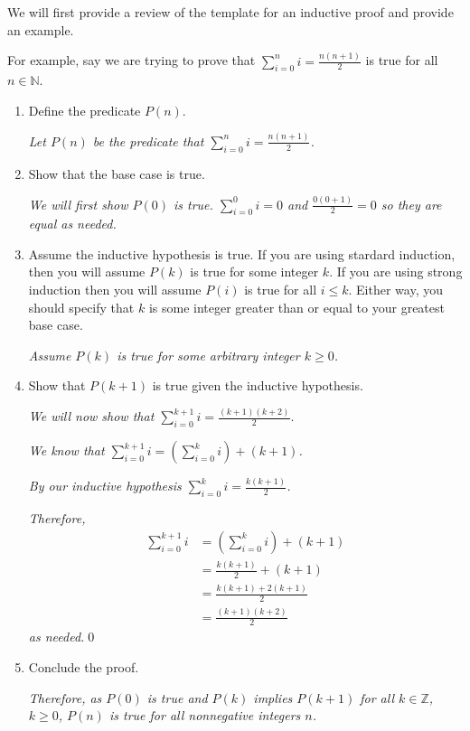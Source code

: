 \documentclass[12pt,letterpaper]{article}
\newcommand\Z{\mathbb Z}
\begin{document}
\begin{mdframed}
We will first provide a review of the template for an inductive proof and provide an example.

      For example, say we are trying to prove that $\sum_{i=0}^n i = \frac{n(n+1)}{2}$ is true for all $n \in \mathbb{N}$. 

      \begin{enumerate}
        \item Define the predicate $P(n)$.

        \textit{Let $P(n)$ be the predicate that $\sum_{i=0}^n i = \frac{n(n+1)}{2}$.}

        \item Show that the base case is true.

        \textit{We will first show $P(0)$ is true. $\sum_{i=0}^0 i = 0$ and $\frac{0(0+1)}{2} = 0$ so they are equal as needed.}

        \item Assume the inductive hypothesis is true. If you are using stardard induction, then you will assume 
            $P(k)$ is true for some integer $k$. If you are using strong induction then you will assume $P(i)$ is true for all $i \leq k$. Either way, you should specify that $k$ is some integer greater than or equal to your greatest base case.

        \textit{Assume $P(k)$ is true for some arbitrary integer $k \geq 0$.}

        \item Show that $P(k+1)$ is true given the inductive hypothesis.

        \textit{We will now show that  $\sum_{i=0}^{k+1} i = \frac{(k+1)(k+2)}{2}$}.

        \textit{We know that $\sum_{i=0}^{k+1} i = \left( \sum_{i=0}^{k} i \right)+ (k+1)$.}

        \textit{By our inductive hypothesis $\sum_{i=0}^k i = \frac{k(k+1)}{2}$.}

         \textit{Therefore,}
        \begin{align*}
            \sum_{i=0}^{k+1} i &= \left( \sum_{i=0}^{k} i \right)+ (k+1) \\
            &=  \frac{k(k+1)}{2} + (k+1) \\
            &= \frac{k(k+1) + 2(k+1)}{2} \\
            &= \frac{(k+1)(k+2)}{2}
        \end{align*}
        \textit{as needed.}\qed

        \item Conclude the proof.
        
        \textit{Therefore, as $P(0)$ is true and $P(k)$ implies $P(k+1)$ for all $k \in \Z$, $k \geq 0$, $P(n)$ is true for all nonnegative integers $n$.}
      \end{enumerate}
\end{mdframed}
\end{document}
